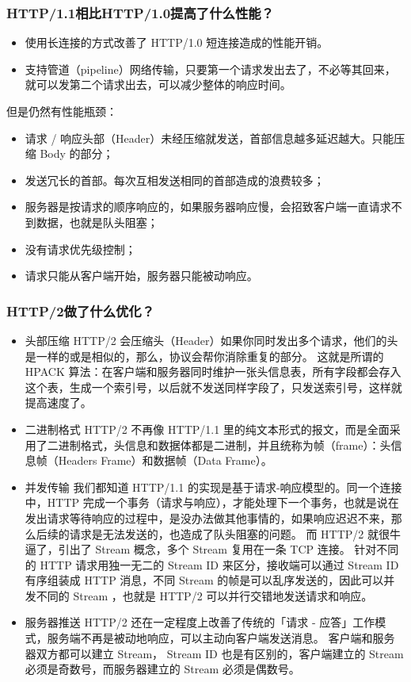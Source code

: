 \documentclass[11pt]{article}
\begin{document}
\subsubsection{HTTP/1.1相比HTTP/1.0提高了什么性能？}
\label{sec:org98a40f6}
\begin{itemize}
\item 使用长连接的方式改善了 HTTP/1.0 短连接造成的性能开销。
\item 支持管道（pipeline）网络传输，只要第一个请求发出去了，不必等其回来，就可以发第二个请求出去，可以减少整体的响应时间。
\end{itemize}
但是仍然有性能瓶颈：
\begin{itemize}
\item 请求 / 响应头部（Header）未经压缩就发送，首部信息越多延迟越大。只能压缩 Body 的部分；
\item 发送冗长的首部。每次互相发送相同的首部造成的浪费较多；
\item 服务器是按请求的顺序响应的，如果服务器响应慢，会招致客户端一直请求不到数据，也就是队头阻塞；
\item 没有请求优先级控制；
\item 请求只能从客户端开始，服务器只能被动响应。
\end{itemize}
\subsubsection{HTTP/2做了什么优化？}
\label{sec:org97d2b11}
\begin{itemize}
\item 头部压缩
HTTP/2 会压缩头（Header）如果你同时发出多个请求，他们的头是一样的或是相似的，那么，协议会帮你消除重复的部分。
这就是所谓的 HPACK 算法：在客户端和服务器同时维护一张头信息表，所有字段都会存入这个表，生成一个索引号，以后就不发送同样字段了，只发送索引号，这样就提高速度了。
\item 二进制格式
HTTP/2 不再像 HTTP/1.1 里的纯文本形式的报文，而是全面采用了二进制格式，头信息和数据体都是二进制，并且统称为帧（frame）：头信息帧（Headers Frame）和数据帧（Data Frame）。
\item 并发传输
我们都知道 HTTP/1.1 的实现是基于请求-响应模型的。同一个连接中，HTTP 完成一个事务（请求与响应），才能处理下一个事务，也就是说在发出请求等待响应的过程中，是没办法做其他事情的，如果响应迟迟不来，那么后续的请求是无法发送的，也造成了队头阻塞的问题。
而 HTTP/2 就很牛逼了，引出了 Stream 概念，多个 Stream 复用在一条 TCP 连接。
针对不同的 HTTP 请求用独一无二的 Stream ID 来区分，接收端可以通过 Stream ID 有序组装成 HTTP 消息，不同 Stream 的帧是可以乱序发送的，因此可以并发不同的 Stream ，也就是 HTTP/2 可以并行交错地发送请求和响应。
\item 服务器推送
HTTP/2 还在一定程度上改善了传统的「请求 - 应答」工作模式，服务端不再是被动地响应，可以主动向客户端发送消息。
客户端和服务器双方都可以建立 Stream， Stream ID 也是有区别的，客户端建立的 Stream 必须是奇数号，而服务器建立的 Stream 必须是偶数号。
\end{itemize}
\end{document}
